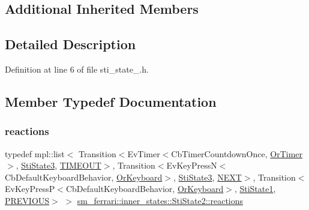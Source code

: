 \subsection*{Additional Inherited Members}


\subsection{Detailed Description}


Definition at line 6 of file sti\+\_\+state\+\_.\+h.



\subsection{Member Typedef Documentation}
\mbox{\label{structsm__ferrari_1_1inner__states_1_1StiState2_a2b4c8b8d812b7b028abf9fd61357ab22}} 
\subsubsection{\texorpdfstring{reactions}{reactions}}
{\footnotesize\ttfamily typedef mpl\+::list$<$ Transition$<$Ev\+Timer$<$Cb\+Timer\+Countdown\+Once, \hyperlink{classsm__ferrari_1_1OrTimer}{Or\+Timer}$>$, \hyperlink{structsm__ferrari_1_1inner__states_1_1StiState3}{Sti\+State3}, \hyperlink{structsm__ferrari_1_1inner__states_1_1StiState2_1_1TIMEOUT}{T\+I\+M\+E\+O\+UT}$>$, Transition$<$Ev\+Key\+PressN$<$Cb\+Default\+Keyboard\+Behavior, \hyperlink{classsm__ferrari_1_1OrKeyboard}{Or\+Keyboard}$>$, \hyperlink{structsm__ferrari_1_1inner__states_1_1StiState3}{Sti\+State3}, \hyperlink{structsm__ferrari_1_1inner__states_1_1StiState2_1_1NEXT}{N\+E\+XT}$>$, Transition$<$Ev\+Key\+PressP$<$Cb\+Default\+Keyboard\+Behavior, \hyperlink{classsm__ferrari_1_1OrKeyboard}{Or\+Keyboard}$>$, \hyperlink{structsm__ferrari_1_1inner__states_1_1StiState1}{Sti\+State1}, \hyperlink{structsm__ferrari_1_1inner__states_1_1StiState2_1_1PREVIOUS}{P\+R\+E\+V\+I\+O\+US}$>$ $>$ \hyperlink{structsm__ferrari_1_1inner__states_1_1StiState2_a2b4c8b8d812b7b028abf9fd61357ab22}{sm\+\_\+ferrari\+::inner\+\_\+states\+::\+Sti\+State2\+::reactions}}




